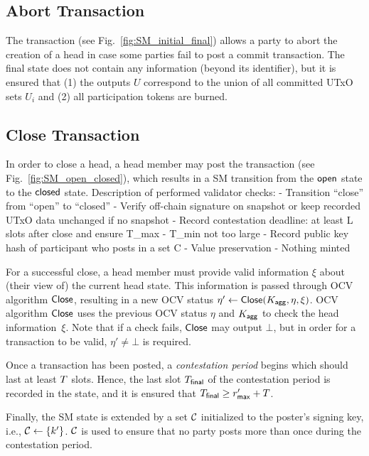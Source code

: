 
\subsection{Abort Transaction}\label{sec:abort-tx} 

The \mtxAbort{} transaction
(see Fig.~\ref{fig:SM_initial_final}) allows a party to abort the
creation of a head in case some parties fail to post a commit
transaction.  The final state does not contain any information (beyond
its identifier), but it is ensured that (1) the outputs $U$ correspond
to the union of all committed UTxO sets $U_i$ and (2) all
participation tokens are burned.





\subsection{Close Transaction} 

In order to close a head, a head
member may post the \mtxClose{} transaction (see
Fig.~\ref{fig:SM_open_closed}), which results in a SM transition
from the $\mathsf{open}$ state to the $\mathsf{closed}$ state.
Description of performed validator checks:
 - Transition “close” from “open” to “closed”
 - Verify off-chain signature on snapshot or keep recorded UTxO data unchanged if no snapshot
 - Record contestation deadline: at least L slots after close and ensure T_max - T_min not too large
 - Record public key hash of participant who posts in a set C
 - Value preservation
 - Nothing minted



For a successful
close, a head member must provide valid information $\xi$ about (their
view of) the current head state.  This information is passed through
OCV algorithm $\mathsf{Close}$, resulting in a new OCV status
$\eta' \gets \mathsf{Close}(K_{\mathsf{agg}},\eta,\xi)$.  OCV algorithm $\mathsf{Close}$
uses the previous OCV status $\eta$ and $K_{\mathsf{agg}}$ to check the head
information~$\xi$.  Note that if a check fails, $\mathsf{Close}$ may output
$\bot$, but in order for a \mtxClose{} transaction to be valid,
$\eta' \neq \bot$ is required.

Once a \mtxClose{} transaction has been posted, a \emph{contestation period}
begins which should last at least $T$ slots.  Hence, the last slot
$T_{\mathsf{final}}$ of the contestation period is recorded in the state, and it
is ensured that $T_{\mathsf{final}} \geq r_{\mathsf{max}}' + T$.

Finally, the SM state is extended by a set $\mathcal C$
initialized to the poster's signing key, i.e.,
$\mathcal C \gets \{k'\}$.   $\mathcal C$ is used to ensure that no party
posts more than once during the contestation period.



